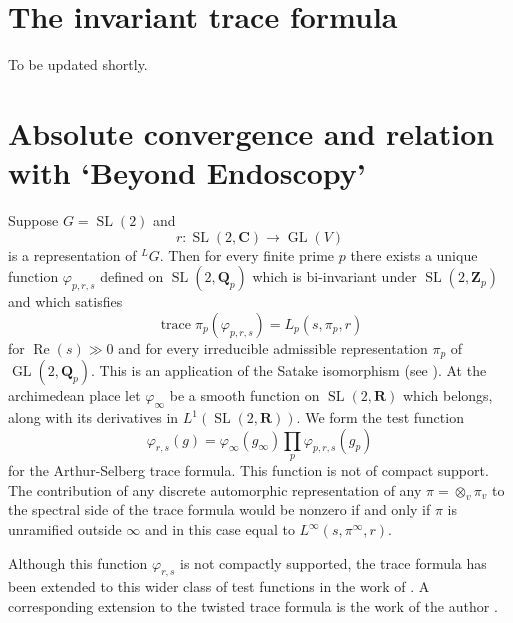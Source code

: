 \documentclass[11pt]{amsart}
\def\C{\mathbf C}
\def\Q{\mathbf Q}
\def\R{\mathbf R}
\def\Z{\mathbf Z}
\def\gl{\operatorname{GL}}
\def\Lone{L^1}
\def\Re{\operatorname{Re}}
\def\sl{\operatorname{SL}}
\def\trace{\operatorname{trace}}
\theoremstyle{remark}
\begin{document}
\section{The invariant trace formula}

{\color{red} To be updated shortly.}




\section{Absolute convergence and relation with `Beyond Endoscopy'}

Suppose $G = \sl(2)$ and 
\[ r : \sl(2, \C) \to \gl(V) \]
is a representation of ${}^LG$. Then for every finite prime $p$ there exists a unique function $\varphi_{p, r, s}$ defined on $\sl(2, \Q_p)$ which is bi-invariant under $\sl(2, \Z_p)$ and which satisfies
\[ \trace \pi_p(\varphi_{p, r, s}) = L_p(s, \pi_p, r) \]
for $\Re(s) \gg 0$ and for every irreducible admissible representation $\pi_p$ of $\gl(2, \Q_p)$. This is an application of the Satake isomorphism (see \cite{MR3220933}). At the archimedean place let $\varphi_\infty$ be a smooth function on $\sl(2, \R)$ which belongs, along with its derivatives in $\Lone(\sl(2, \R))$. We form the test function
\[ \varphi_{r, s}(g) = \varphi_\infty(g_\infty) \displaystyle\prod_p \varphi_{p, r, s}(g_p) \]
for the Arthur-Selberg trace formula. This function is not of compact support. The contribution of any discrete automorphic representation of any $\pi = \otimes_v \pi_v$ to the spectral side of the trace formula would be nonzero if and only if $\pi$ is unramified outside $\infty$ and in this case equal to $L^\infty(s, \pi^\infty, r)$. 

Although this function $\varphi_{r, s}$ is not compactly supported, the trace formula has been extended to this wider class of test functions in the work of \cite{FL16, FLM}. A corresponding extension to the twisted trace formula is the work of the author \cite{Par17}. 




\end{document}
